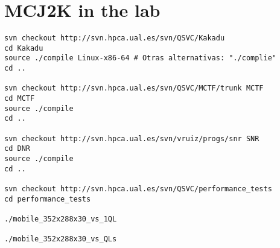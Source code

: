 \begin{comment}
\section{Future research}
\begin{enumerate}
\item \textbf{Determination of the optimal progression of the
    code-stream in limited bit-rate contexts.} In other words, which
  is the best decoding order to minimize the distortion of a GOP (or a
  group of them) when the avaiable bandwidth is unknown and the
  code-stream is going to be truncated?
\item \textbf{Optimization of the motion estimation parameters in
    order to decrease the coding bit-rate.} Several aspects such the
  sub-pixel accurary, the search range, the selection of the motion
  vectors (see Equations \ref{eq:motion_pred_1} and
  \ref{eq:motion_pred_2}), etc. influence on the encoding bit-rate of
  the motion and the texture informations. Which is the
  best selection of these parameters/algorithm to minimize the final
  rate-distortion curve?
\end{enumerate}
\end{comment}

\section*{MCJ2K in the lab}
\fontsize{8}{8}
\begin{verbatim}
svn checkout http://svn.hpca.ual.es/svn/QSVC/Kakadu
cd Kakadu
source ./compile Linux-x86-64 # Otras alternativas: "./complie"
cd ..

svn checkout http://svn.hpca.ual.es/svn/QSVC/MCTF/trunk MCTF
cd MCTF
source ./compile
cd ..

svn checkout http://svn.hpca.ual.es/svn/vruiz/progs/snr SNR
cd DNR
source ./compile
cd ..

svn checkout http://svn.hpca.ual.es/svn/QSVC/performance_tests
cd performance_tests

./mobile_352x288x30_vs_1QL

./mobile_352x288x30_vs_QLs
\end{verbatim}

